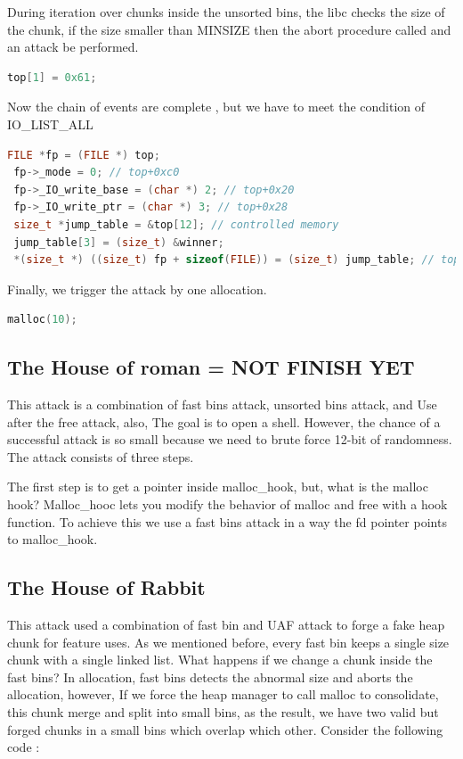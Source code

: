\documentclass{masterthesis}
\newcommand*\fb{fast bins}
\newcommand*\ub{unsorted bins}
\newcommand*\sbs{small bins}
\begin{document}
During iteration over chunks inside the \ub{}, the libc checks the size of the chunk, if the size smaller than MINSIZE then the abort procedure called and an attack be performed.

\begin{lstlisting}[language=c,frame=tlrb]
top[1] = 0x61;
\end{lstlisting}


Now the chain of events are complete , but we have to meet the condition of IO\_LIST\_ALL

\begin{lstlisting}[language=c,frame=tlrb]
 FILE *fp = (FILE *) top;
 fp->_mode = 0; // top+0xc0
 fp->_IO_write_base = (char *) 2; // top+0x20
 fp->_IO_write_ptr = (char *) 3; // top+0x28
 size_t *jump_table = &top[12]; // controlled memory
 jump_table[3] = (size_t) &winner;
 *(size_t *) ((size_t) fp + sizeof(FILE)) = (size_t) jump_table; // top+0xd8
\end{lstlisting}

Finally, we trigger the attack by one allocation. 

\begin{lstlisting}[language=c,frame=tlrb]
 malloc(10);
\end{lstlisting}

\subsection{The House of roman = NOT FINISH YET}
This attack is a combination of \fb{} attack, \ub{} attack, and Use after the free attack, also, The goal is to open a shell. However, the chance of a successful attack is so small because we need to brute force 12-bit of randomness. The attack consists of three steps.

The first step is to get a pointer inside malloc\_hook, but, what is the malloc hook? Malloc\_hooc lets you modify the behavior of malloc and free with a hook function. To achieve this we use a \fb{} attack in a way the fd pointer points to malloc\_hook.

\subsection{The House of Rabbit}

This attack used a combination of fast bin and UAF attack to forge a fake heap chunk for feature uses. As we mentioned before, every fast bin keeps a single size chunk with a single linked list. What happens if we change a chunk inside the \fb{}? In allocation, \fb{} detects the abnormal size and aborts the allocation, however, If we force the heap manager to call malloc to consolidate, this chunk merge and split into \sbs{}, as the result, we have two valid but forged chunks in a \sbs{} which overlap which other. Consider the following code : 
\end{document}
